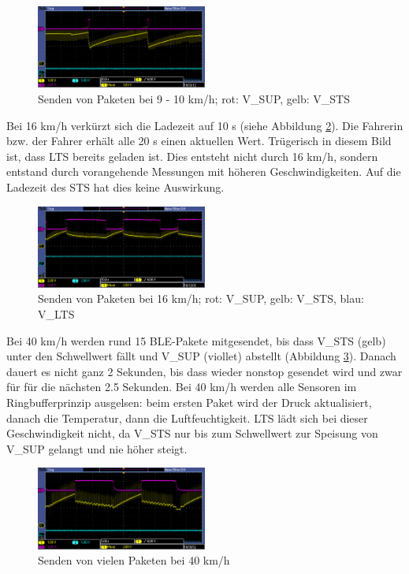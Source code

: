 \begin{figure}[ht]
   \includegraphics[width=0.5\textwidth]{4Resultate/imag/pic_3.PNG}
    \caption{Senden von Paketen bei 9 - 10 km/h; rot: V\_SUP, gelb: V\_STS}
    \label{paket_100kmh}
\end{figure}

Bei 16 km/h verkürzt sich die Ladezeit auf 10 s (siehe Abbildung \ref{paket_16kmh}). Die Fahrerin bzw. der Fahrer erhält alle 20 s einen aktuellen Wert. Trügerisch in diesem Bild ist, dass LTS bereits geladen ist. Dies entsteht nicht durch 16 km/h, sondern entstand durch vorangehende Messungen mit höheren Geschwindigkeiten. Auf die Ladezeit des STS hat dies keine Auswirkung.

\begin{figure}[ht]
   \includegraphics[width=0.5\textwidth]{4Resultate/imag/pic2.PNG}
    \caption{Senden von Paketen bei 16 km/h; rot: V\_SUP, gelb: V\_STS, blau: V\_LTS}
    \label{paket_16kmh}
\end{figure}

Bei 40 km/h werden rund 15 BLE-Pakete mitgesendet, bis dass V\_STS (gelb) unter den Schwellwert fällt und V\_SUP (viollet) abstellt (Abbildung \ref{paket_40kmh}). Danach dauert es nicht ganz 2 Sekunden, bis dass wieder nonstop gesendet wird und zwar für für die nächsten 2.5 Sekunden. Bei 40 km/h werden alle Sensoren im Ringbufferprinzip ausgelsen: beim ersten Paket wird der Druck aktualisiert, danach die Temperatur, dann die Luftfeuchtigkeit. LTS lädt sich bei dieser Geschwindigkeit nicht, da V\_STS nur bis zum Schwellwert zur Speisung von V\_SUP gelangt und nie höher steigt.

\begin{figure}[ht]
   \includegraphics[width=0.5\textwidth]{4Resultate/imag/pic4.PNG}
    \caption{Senden von vielen Paketen bei 40 km/h}
    \label{paket_40kmh}
\end{figure}


